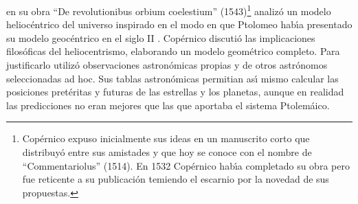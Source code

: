 en su obra ``De revolutionibus orbium coelestium'' (1543)\footnote{Cop\'ernico expuso inicialmente sus ideas en un manuscrito corto que distribuy\'o entre sus amistades y que hoy se conoce con el nombre de ``Commentariolus'' (1514). En 1532 Cop\'ernico hab\'\i{}a completado su obra pero fue reticente a su publicaci\'on temiendo el escarnio por la novedad de sus propuestas.} analiz\'o un modelo helioc\'entrico del universo inspirado en el modo en que Ptolomeo hab\'\i{}a presentado su modelo geoc\'entrico en el siglo II . Cop\'ernico discuti\'o las implicaciones filos\'oficas del heliocentrismo, elaborando un modelo geom\'etrico completo. Para justificarlo utiliz\'o  observaciones astron\'omicas propias y de otros astr\'onomos  seleccionadas ad hoc. Sus tablas astron\'omicas permitian as\'\i{} mismo calcular las posiciones pret\'eritas y futuras de las estrellas y los planetas, aunque en realidad las predicciones no eran mejores que las que aportaba el sistema Ptolem\'aico.%
%
%


